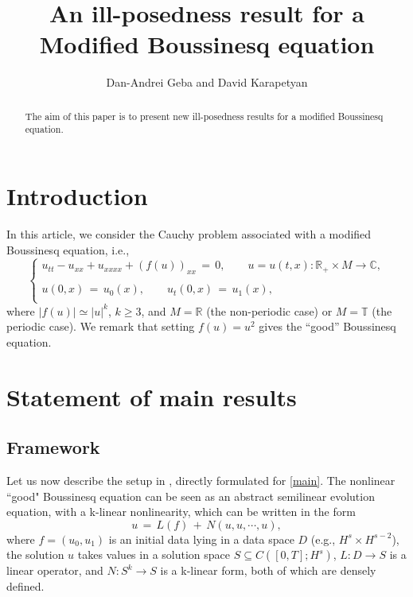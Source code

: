 \documentclass{amsart}
\begin{document}
\title{An ill-posedness result for a Modified Boussinesq equation}

\author{Dan-Andrei Geba and David Karapetyan}

\address{Department of Mathematics, University of Rochester, Rochester, NY 14627}
\address{Department of Mathematics, University of Rochester, Rochester, NY 14627}
\date{}

\begin{abstract}
The aim of this paper is to present new ill-posedness results for a modified Boussinesq equation. 
\end{abstract}


\maketitle

\section{Introduction}

In this article, we consider the Cauchy problem associated with a modified Boussinesq equation, i.e.,
\begin{equation}
\left\{
\begin{array}{l}
u_{tt}-u_{xx}+u_{xxxx}+(f(u))_{xx}\,=\,0, \qquad u=u(t,x): \mathbb{R}_+\times M \to \mathbb{C},\\
\\
u(0,x)\,=\,u_0(x),\qquad u_t(0,x)\,=\,u_1(x),\\
\end{array}\right.
\label{main}
\end{equation}
where $| f(u)| \simeq |u|^{k}$, $k \ge 3$, and $M=\mathbb{R}$ (the non-periodic case) or $M=\mathbb{T}$ (the periodic case). We remark that setting  $f(u) = u^{2}$ gives the ``good'' Boussinesq equation.

\section{Statement of main results}

\subsection{Framework} Let us now describe the setup in \cite{BT06}, directly formulated for \eqref{main}. The nonlinear ``good" Boussinesq equation can be seen as an abstract semilinear evolution equation, with a k-linear nonlinearity, which can be written in the form 
\begin{equation}
u\,=\,L(f)\,+\,N(u,u, \cdots, u),
\label{LN}
\end{equation}
where $f=(u_0, u_1)$ is an initial data lying in a data space $D$ (e.g., $H^s \times H^{s-2}$), the solution $u$ takes values in a solution space $S \subseteq	 C([0,T]; H^s)$, $L: D \to S$ is a linear operator, and $N:S^{k} \to S$ is a k-linear form, both of which are densely defined.  
\end{document}
